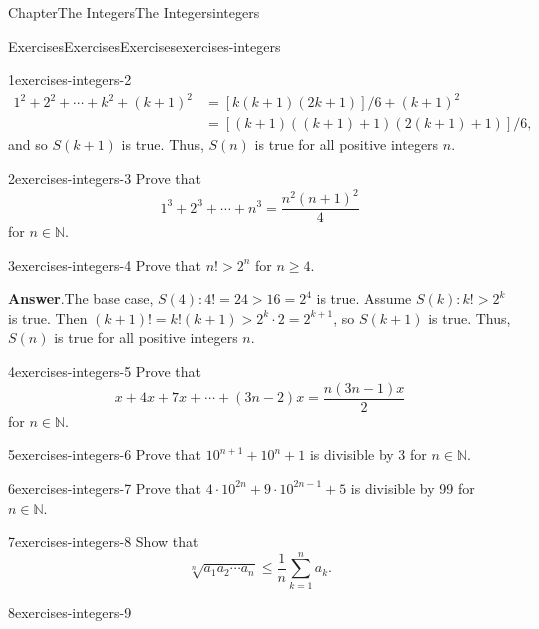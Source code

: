 \documentclass[oneside,10pt,]{book}
\newcommand{\blocktitlefont}{\relax}
\numberwithin{equation}{section}
\newcommand{\gt}{>}
\begin{document}
\begin{chapterptx}{Chapter}{The Integers}{}{The Integers}{}{}{integers}
\begin{exercises-section}{Exercises}{Exercises}{}{Exercises}{}{}{exercises-integers}
\begin{divisionexercise}{1}{}{}{exercises-integers-2}
\begin{align*}
1^2 + 2^2 + \cdots + k^2 + (k + 1)^2 & = [k(k + 1)(2k + 1)]/6 + (k + 1)^2\\
& = [(k + 1)((k + 1) + 1)(2(k + 1) + 1)]/6,
\end{align*}
and so \(S(k + 1)\) is true. Thus, \(S(n)\) is true for all positive integers \(n\).%
\end{divisionexercise}%
\begin{divisionexercise}{2}{}{}{exercises-integers-3}%
Prove that%
\begin{equation*}
1^3 + 2^3 + \cdots + n^3 = \frac{n^2(n + 1)^2}{4}
\end{equation*}
for \(n \in {\mathbb N}\).%
\end{divisionexercise}%
\begin{divisionexercise}{3}{}{}{exercises-integers-4}%
Prove that \(n! \gt 2^n\) for \(n \geq 4\).%
\par\smallskip%
\noindent\textbf{\blocktitlefont Answer}.\hypertarget{exercises-integers-4-2}{}\quad{}The base case, \(S(4): 4! = 24 \gt 16 =2^4\) is true. Assume \(S(k): k! \gt 2^k\) is true. Then \((k + 1)! = k! (k + 1) \gt 2^k \cdot 2 = 2^{k + 1}\), so \(S(k + 1)\) is true. Thus, \(S(n)\) is true for all positive integers \(n\).%
\end{divisionexercise}%
\begin{divisionexercise}{4}{}{}{exercises-integers-5}%
Prove that%
\begin{equation*}
x + 4x + 7x + \cdots + (3n - 2)x = \frac{n(3n - 1)x}{2}
\end{equation*}
for \(n \in {\mathbb N}\).%
\end{divisionexercise}%
\begin{divisionexercise}{5}{}{}{exercises-integers-6}%
Prove that \(10^{n + 1} + 10^n + 1\) is divisible by 3 for \(n \in {\mathbb N}\).%
\end{divisionexercise}%
\begin{divisionexercise}{6}{}{}{exercises-integers-7}%
Prove that \(4 \cdot 10^{2n} + 9 \cdot 10^{2n - 1} + 5\) is divisible by 99 for \(n \in {\mathbb N}\).%
\end{divisionexercise}%
\begin{divisionexercise}{7}{}{}{exercises-integers-8}%
Show that%
\begin{equation*}
\sqrt[n]{a_1 a_2 \cdots a_n} \leq \frac{1}{n} \sum_{k = 1}^{n} a_k.
\end{equation*}
%
\end{divisionexercise}%
\begin{divisionexercise}{8}{}{}{exercises-integers-9}%

\end{divisionexercise}
\end{exercises-section}
\end{chapterptx}
\end{document}
